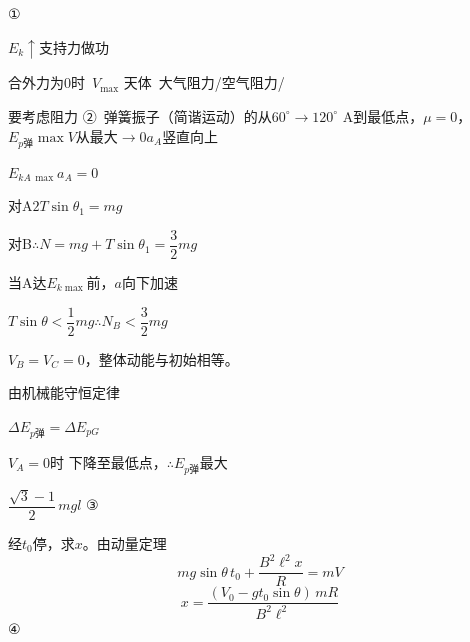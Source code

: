 ①

$E_{k}\uparrow$\quad 支持力做功

合外力为0时\ $V_{\max}$
天体\ 大气阻力\quad /\quad 空气阻力\quad /\quad \uline{}

要考虑阻力
②\ 弹簧振子（简谐运动）的从$60^\circ\to120^\circ$ A到最低点，$\mu=0$，\quad $E_{p\text{弹}}\max$\quad $V$从最大$\to0$\quad $a_A$竖直向上

$E_{kA\,\max}$\quad $a_A=0$

对A\quad $2T\sin\theta_1=mg$

对B\quad $\therefore N=mg+T\sin\theta_1=\dfrac{3}{2}mg$

当A达$E_{k\max}$前，$a$向下加速

$T\sin\theta<\dfrac{1}{2}mg$\quad $\therefore N_B<\dfrac{3}{2}mg$

$V_B=V_C=0$，整体动能与初始相等。

由机械能守恒定律

$\Delta E_{p\text{弹}}=\Delta E_{pG}$

$V_A=0$时 下降至最低点，$\therefore E_{p\text{弹}}$最大

$\dfrac{\sqrt{3}-1}{2}\,mgl$
③

经$t_0$停，求$x$。由动量定理
\[ mg\sin\theta\,t_0+\frac{B^2\ell^2x}{R}=mV \]
\[ x=\frac{(V_0-gt_0\sin\theta)\,mR}{B^2\ell^2} \]
④

